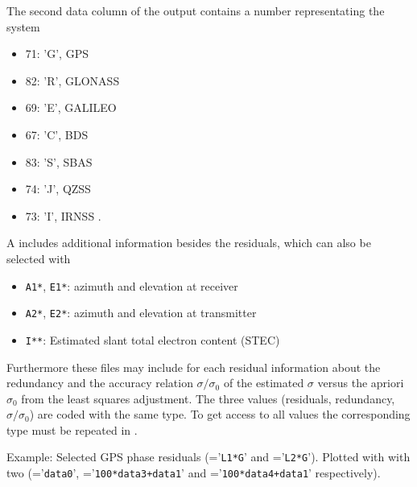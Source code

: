 The second data column of the output contains a number representating the system
\begin{itemize}
\item 71: 'G', GPS
\item 82: 'R', GLONASS
\item 69: 'E', GALILEO
\item 67: 'C', BDS
\item 83: 'S', SBAS
\item 74: 'J', QZSS
\item 73: 'I', IRNSS .
\end{itemize}

A  includes additional information
besides the residuals, which can also be selected with 
\begin{itemize}
\item \verb|A1*|, \verb|E1*|: azimuth and elevation at receiver
\item \verb|A2*|, \verb|E2*|: azimuth and elevation at transmitter
\item \verb|I**|: Estimated slant total electron content (STEC)
\end{itemize}

Furthermore these files may include for each residual 
information about the redundancy and the accuracy relation $\sigma/\sigma_0$
of the estimated $\sigma$ versus the apriori $\sigma_0$ from the least squares adjustment.
The three values (residuals, redundancy, $\sigma/\sigma_0$) are coded with the same type.
To get access to all values the corresponding type must be repeated in .

Example: Selected GPS phase residuals (='\verb|L1*G|' and ='\verb|L2*G|').
Plotted with  with two 
(='\verb|data0|',  ='\verb|100*data3+data1|' and ='\verb|100*data4+data1|' respectively).


